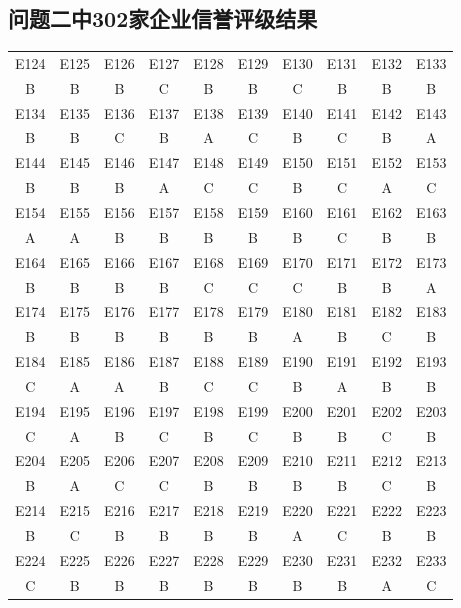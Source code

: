 \documentclass[withoutpreface,bwprint]{cumcmthesis} %
\begin{document}
\begin{appendices}
\section{问题二中302家企业信誉评级结果} \label{ap:302}
\begin{table}[h]
	\begin{center}
		\begin{tabular}{|c|c|c|c|c|c|c|c|c|c|}
			\hline
			E124 & E125 & E126 & E127 & E128 & E129 & E130 & E131 & E132 & E133 \\ 
			B & B & B & C & B & B & C & B & B & B \\ \hline
			E134 & E135 & E136 & E137 & E138 & E139 & E140 & E141 & E142 & E143 \\ 
			B & B & C & B & A & C & B & C & B & A \\ \hline
			E144 & E145 & E146 & E147 & E148 & E149 & E150 & E151 & E152 & E153 \\ 
			B & B & B & A & C & C & B & C & A & C \\ \hline
			E154 & E155 & E156 & E157 & E158 & E159 & E160 & E161 & E162 & E163 \\ 
			A & A & B & B & B & B & B & C & B & B \\ \hline
			E164 & E165 & E166 & E167 & E168 & E169 & E170 & E171 & E172 & E173 \\ 
			B & B & B & B & C & C & C & B & B & A \\ \hline
			E174 & E175 & E176 & E177 & E178 & E179 & E180 & E181 & E182 & E183 \\ 
			B & B & B & B & B & B & A & B & C & B \\ \hline
			E184 & E185 & E186 & E187 & E188 & E189 & E190 & E191 & E192 & E193 \\ 
			C & A & A & B & C & C & B & A & B & B \\ \hline
			E194 & E195 & E196 & E197 & E198 & E199 & E200 & E201 & E202 & E203 \\ 
			C & A & B & C & B & C & B & B & C & B \\ \hline
			E204 & E205 & E206 & E207 & E208 & E209 & E210 & E211 & E212 & E213 \\ 
			B & A & C & C & B & B & B & B & C & B \\ \hline
			E214 & E215 & E216 & E217 & E218 & E219 & E220 & E221 & E222 & E223 \\ 
			B & C & B & B & B & B & A & C & B & B \\ \hline
			E224 & E225 & E226 & E227 & E228 & E229 & E230 & E231 & E232 & E233 \\ 
			C & B & B & B & B & B & B & B & A & C \\ \hline

\end{tabular}
\end{center}
\end{table}
\end{appendices}
\end{document}
